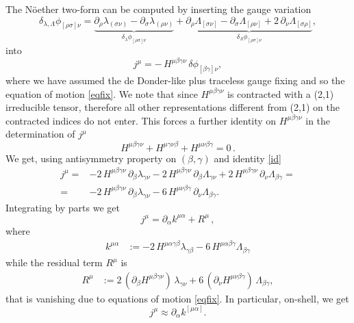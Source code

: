 \documentclass[a4paper,12pt]{article}
\begin{document}
The N\"oether two-form can be computed by inserting the gauge variation
\begin{equation}
\delta_{\lambda,\Lambda}\phi_{[\rho\sigma]\nu}
=
\underbrace{\partial_{\rho}\lambda_{(\sigma\nu)}-\partial_{\sigma}\lambda_{(\rho\nu)}}_{\delta_\lambda\phi_{[\rho\sigma]\nu}}
+
\underbrace{\partial_{\rho}\Lambda_{[\sigma\nu]}-\partial_{\sigma}\Lambda_{[\rho\nu]}+2\,\partial_{\nu}\Lambda_{[\sigma\rho]}}_{\delta_\Lambda\phi_{[\rho\sigma]\nu}},
\label{fullgaugephi}
\end{equation}
into
\begin{equation}
j^{\mu}
=
-\,H^{\mu\beta\gamma\nu}\,\delta\phi_{[\beta\gamma]\nu},
\label{ThetaDef}
\end{equation}
where we have assumed the de Donder-like plus traceless gauge fixing and so the equation of motion \eqref{eqfix}. We note that since $H^{\mu\beta\gamma\nu}$ is contracted with a (2,1) irreducible tensor, therefore all other representations different from (2,1) on the contracted indices do not enter. This forces a further identity on $H^{\mu\beta\gamma\nu}$ in the determination of $j^{\mu}$
\begin{equation}
H^{\mu\beta\gamma\nu}
+ H^{\mu\gamma\nu\beta}
+ H^{\mu\nu\beta\gamma}
= 0 \, .
\label{id}
\end{equation}
We get, using antisymmetry property on $(\beta,\gamma)$ and identity \eqref{id}
\begin{equation}
\begin{aligned}
j^{\mu}
=&
-2\,H^{\mu\beta\gamma\nu}\,\partial_{\beta}\lambda_{\gamma\nu}
-2\,H^{\mu\beta\gamma\nu}\,\partial_{\beta}\Lambda_{\gamma\nu}
+2\,H^{\mu\beta\gamma\nu}\,\partial_{\nu}\Lambda_{\beta\gamma}=\\
=&-2\,H^{\mu\beta\gamma\nu}\,\partial_{\beta}\lambda_{\gamma\nu}
-6\, H^{\mu\nu\beta\gamma}\,\partial_{\nu}\Lambda_{\beta\gamma}.
\end{aligned}
\label{j:traceless}
\end{equation}
Integrating by parts we get
\begin{equation}
j^{\mu}=\partial_{\alpha}k^{\mu\alpha}+R^{\mu} \, ,
\label{j:split}
\end{equation}
where
\begin{equation}
\begin{aligned}
k^{\mu\alpha}
&:=
-2\,H^{\mu\alpha\gamma\beta}\lambda_{\gamma\beta}
-6\,H^{\mu\alpha\beta\gamma}\Lambda_{\beta\gamma}
\end{aligned}
\label{def:U}
\end{equation}
while the residual term \(R^\mu\) is
\begin{equation}
\begin{aligned}
R^{\mu}
&:=
2\,(\partial_{\beta}H^{\mu\beta\gamma\nu})\,\lambda_{\gamma\nu}
+6\,(\partial_{\nu}H^{\mu\nu\beta\gamma})\,\Lambda_{\beta\gamma},
\end{aligned}
\label{def:R0}
\end{equation}
that is vanishing due to equations of motion \eqref{eqfix}. In particular, on-shell, we get
\begin{equation}
j^\mu\approx
\partial_{\alpha}k^{[\mu\alpha]}.
\label{ThetaFullOnShell}
\end{equation}
\end{document}
